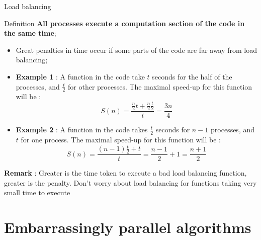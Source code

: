 \documentclass[compress,10pt,aspectratio=169]{beamer}
\begin{document}
\begin{frame}[fragile]{Load balancing}
    \scriptsize
    \begin{block}{Definition}
        \textbf{All processes execute a computation section of the code in the same time};
    \end{block}

    \begin{itemize}
        \item Great penalties in time occur if some parts of the code are far away from load balancing;
        \item \textbf{Example 1} : A function in the code take $t$ seconds for the half of the processes, and $\frac{t}{2}$
              for other processes. The maximal speed-up for this function will be :
            \[
                S(n) = \frac{\frac{n}{2}t + \frac{n}{2}\frac{t}{2}}{t} = \frac{3n}{4}
            \]
        \item \textbf{Example 2} : A function in the code takes $\frac{t}{2}$ seconds for $n-1$ processes, and $t$
            for one process. The maximal speed-up for this function will be :
          \[
              S(n) = \frac{(n-1)\frac{t}{2} + t}{t} = \frac{n-1}{2} + 1 = \frac{n+1}{2}
          \]
  \end{itemize}

  \textbf{Remark} : Greater is the time token to execute a  bad load balancing function, greater is the penalty. Don't worry
  about load balancing for functions taking very small time to execute
\end{frame}

\section{Embarrassingly parallel algorithms}
\end{document}

